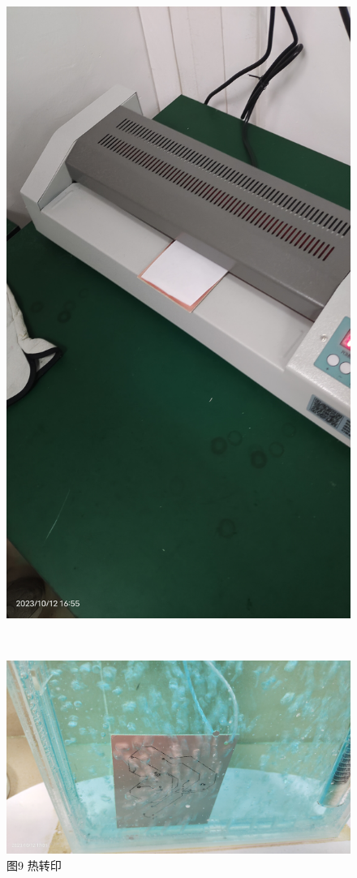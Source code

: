 \documentclass[a4paper,12pt]{article}
\begin{document}
\begin{enumerate}
\begin{figure}[h]
\begin{minipage}{0.35\textwidth}
					\includegraphics[width=\textwidth,height=0.3\textheight]{6.jpg}
					\caption*{图9 热转印}
				\end{minipage}
				\\
				\begin{minipage}{0.35\textwidth}
					\centering
					\includegraphics[width=\textwidth]{3.jpg}

\end{minipage}
\end{figure}
\end{enumerate}
\end{document}
